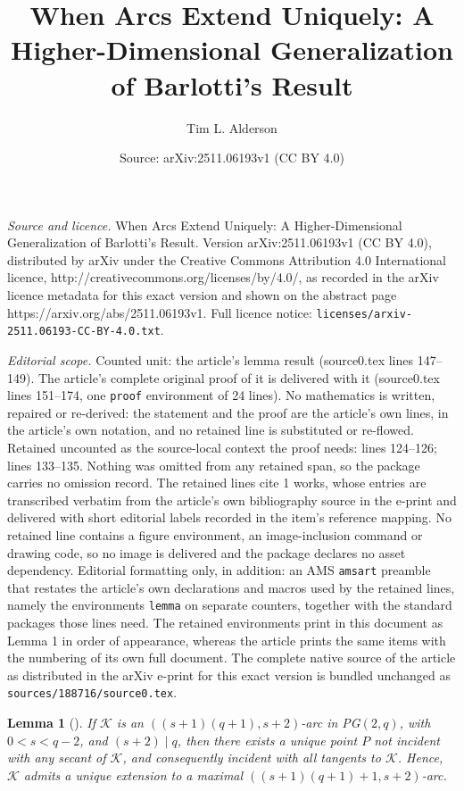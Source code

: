 \documentclass[10pt,a4paper]{amsart}
\title{When Arcs Extend Uniquely: A Higher-Dimensional Generalization of Barlotti’s Result}
\author{Tim L. Alderson}
\date{Source: arXiv:2511.06193v1 (CC BY 4.0)}
\newtheorem{lemma}{Lemma}
\newcommand{\K}{\mathcal{K}}
\begin{document}
\maketitle

\noindent\emph{Source and licence.} When Arcs Extend Uniquely: A Higher-Dimensional Generalization of Barlotti’s Result. Version arXiv:2511.06193v1 (CC BY 4.0), distributed by arXiv under the Creative Commons Attribution 4.0 International licence, http://creativecommons.org/licenses/by/4.0/, as recorded in the arXiv licence metadata for this exact version and shown on the abstract page https://arxiv.org/abs/2511.06193v1. Full licence notice: \texttt{licenses/arxiv-2511.06193-CC-BY-4.0.txt}.\par\smallskip

\noindent\textit{Editorial scope.} Counted unit: the article's lemma result (source0.tex lines 147--149). The article's complete original proof of it is delivered with it (source0.tex lines 151--174, one \texttt{proof} environment of 24 lines). No mathematics is written, repaired or re-derived: the statement and the proof are the article's own lines, in the article's own notation, and no retained line is substituted or re-flowed.  Retained uncounted as the source-local context the proof needs: lines 124--126; lines 133--135.  Nothing was omitted from any retained span, so the package carries no omission record.  The retained lines cite 1 works, whose entries are transcribed verbatim from the article's own bibliography source in the e-print and delivered with short editorial labels recorded in the item's reference mapping.  No retained line contains a figure environment, an image-inclusion command or drawing code, so no image is delivered and the package declares no asset dependency.  Editorial formatting only, in addition: an AMS \texttt{amsart} preamble that restates the article's own declarations and macros used by the retained lines, namely the environments \texttt{lemma} on separate counters, together with the standard packages those lines need.  The retained environments print in this document as Lemma 1 in order of appearance, whereas the article prints the same items with the numbering of its own full document.  The complete native source of the article as distributed in the arXiv e-print for this exact version is bundled unchanged as \texttt{sources/188716/source0.tex}.
\begin{lemma}[\cite{MR0083141}]\label{lem Barlotti Extension k = 3}
	If \( \K \) is an \(((s+1)(q+1), s+2)\)-arc in PG\((2, q)\), with \( 0 < s < q - 2 \), and \( (s+2) \mid q \), then there exists a unique point \( P \) not incident with any secant of \( \K \), and consequently incident with all tangents to \( \K \). Hence, \( \K \) admits a unique extension to a maximal \(((s+1)(q+1)+1, s+2)\)-arc.
\end{lemma}
\end{document}
